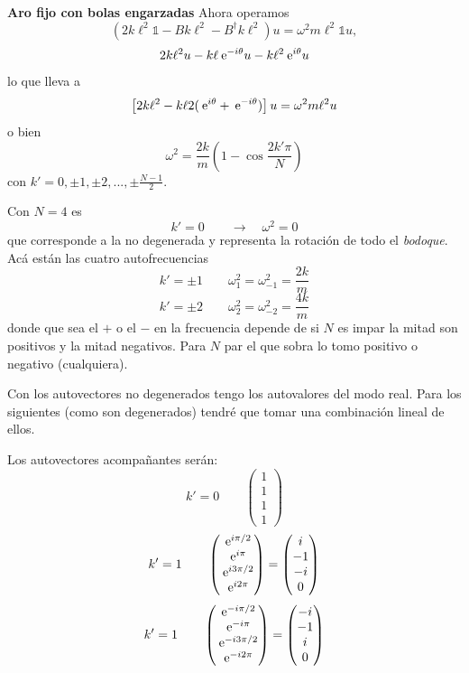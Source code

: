 \documentclass[10pt,oneside]{CBFT_book}
\begin{document}
\begin{ejemplo}{\bf Aro fijo con bolas engarzadas}
Ahora operamos
\[
	( 2 k \ell^2 \mathbb{1} - B k \ell^2 - B^\dagger k \ell^2 ) u = \omega^2 m \ell^2 \mathbb{1} u,
\]
\[
	2 k \ell^2 u - k \ell \:\mathrm{e}^{-i\theta} u - k \ell^2 \:\mathrm{e}^{i\theta} u
\]
lo que lleva a
\[
	\left[ 2 k \ell^2 - k \ell 2 ( \:\mathrm{e}^{i\theta} + \:\mathrm{e}^{-i\theta} ) \right] u = \omega^2 m \ell^2 u
\]
o bien 
\[
	\omega^2 = \frac{2k}{m}\left( 1 - \cos \frac{2k'\pi}{N} \right)
\]
con $k'= 0, \pm 1, \pm 2, ..., \pm \frac{N-1}{2}$.

Con $N=4$ es 
\[
	k'=0 \qquad \to \quad \omega^2=0
\]
que corresponde a la no degenerada y representa la rotación de todo el {\it bodoque}.
Acá están las cuatro autofrecuencias
\[
	k' = \pm 1 \qquad \omega^2_1 = \omega_{-1}^2 = \frac{2k}{m}
\]
\[
	k' = \pm 2 \qquad \omega^2_2 = \omega_{-2}^2 = \frac{4k}{m}
\]
donde que sea el $+$ o el $-$ en la frecuencia depende de si $N$ es impar la mitad son positivos y la mitad negativos.
Para $N$ par el que sobra lo tomo positivo o negativo (cualquiera).

Con los autovectores no degenerados tengo los autovalores del modo real. Para los siguientes (como son degenerados) tendré 
que tomar una combinación lineal de ellos.

Los autovectores acompañantes serán:
\[
	k' = 0 \qquad \begin{pmatrix}
	               1 \\
	               1 \\
	               1 \\
	               1
	              \end{pmatrix}
\]
\[
	k' = 1 \qquad \begin{pmatrix}
	               \:\mathrm{e}^{i \pi/2 } \\
	               \:\mathrm{e}^{i \pi } \\
	               \:\mathrm{e}^{i 3\pi/2 } \\
	               \:\mathrm{e}^{i 2\pi }
	               \end{pmatrix} =
		       \begin{pmatrix}
	               i \\
	               -1 \\
	               -i \\
	               0
	               \end{pmatrix}
\] 
\[
	k' = 1 \qquad \begin{pmatrix}
	               \:\mathrm{e}^{-i \pi/2 } \\
	               \:\mathrm{e}^{-i \pi } \\
	               \:\mathrm{e}^{-i 3\pi/2 } \\
	               \:\mathrm{e}^{-i 2\pi }
	               \end{pmatrix} =
		       \begin{pmatrix}
	               -i \\
	               -1 \\
	               i \\
	               0
	               \end{pmatrix}
\]


\end{ejemplo}
\end{document}
